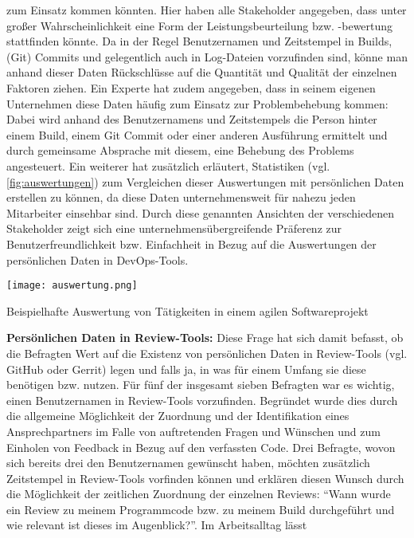 zum Einsatz kommen könnten. Hier haben alle Stakeholder angegeben, dass unter großer Wahrscheinlichkeit eine Form der Leistungsbeurteilung bzw. -bewertung stattfinden könnte. Da in der Regel Benutzernamen und Zeitstempel in Builds, (Git) Commits und gelegentlich auch in Log-Dateien vorzufinden sind, könne man
anhand dieser Daten Rückschlüsse auf die Quantität und Qualität der einzelnen Faktoren ziehen. \newline Ein Experte hat zudem angegeben, dass in seinem eigenen Unternehmen diese Daten häufig zum Einsatz zur Problembehebung kommen: Dabei wird anhand des Benutzernamens und Zeitstempels die Person hinter einem Build,
einem Git Commit oder einer anderen Ausführung ermittelt und durch gemeinsame Absprache mit diesem, eine Behebung des Problems angesteuert. \newline Ein weiterer hat zusätzlich erläutert, Statistiken (vgl. \ref{fig:auswertungen}) zum Vergleichen dieser Auswertungen mit persönlichen Daten erstellen zu können, da diese Daten unternehmensweit
für nahezu jeden Mitarbeiter einsehbar sind. \newline Durch diese genannten Ansichten der verschiedenen Stakeholder zeigt sich eine unternehmensübergreifende Präferenz zur Benutzerfreundlichkeit bzw. Einfachheit in Bezug auf die Auswertungen der persönlichen Daten in DevOps-Tools. \newline \newline
\begin{marginfigure}[-3\baselineskip]
    \texttt{[image: auswertung.png]}
    \caption{\label{fig:auswertungen}Beispielhafte Auswertung von Tätigkeiten in einem agilen Softwareprojekt \cite{Voigt:2015aa}}
\end{marginfigure}
\textbf{Persönlichen Daten in Review-Tools:} \newline
Diese Frage hat sich damit befasst, ob die Befragten Wert auf die Existenz von persönlichen Daten in Review-Tools (vgl. GitHub oder Gerrit) legen und falls ja, in was für einem Umfang sie diese benötigen bzw. nutzen. Für fünf der insgesamt sieben Befragten war es wichtig, einen Benutzernamen in
Review-Tools vorzufinden. Begründet wurde dies durch die allgemeine Möglichkeit der Zuordnung und der Identifikation eines Ansprechpartners im Falle von auftretenden Fragen und Wünschen und zum Einholen von Feedback in Bezug auf den verfassten Code. Drei Befragte, wovon sich bereits drei den Benutzernamen
gewünscht haben, möchten zusätzlich Zeitstempel in Review-Tools vorfinden können und erklären diesen Wunsch durch die Möglichkeit der zeitlichen Zuordnung der einzelnen Reviews: \enquote{Wann wurde ein Review zu meinem Programmcode bzw. zu meinem Build durchgeführt und wie relevant ist dieses im Augenblick?}. Im Arbeitsalltag lässt
